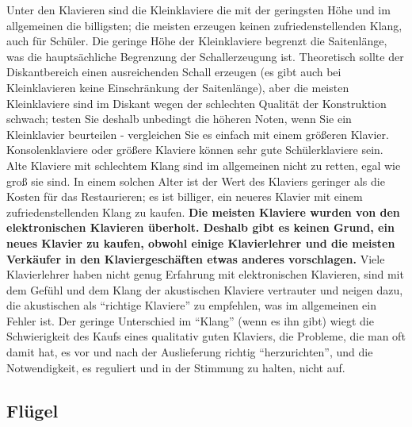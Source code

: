 Unter den Klavieren sind die Kleinklaviere die mit der geringsten Höhe und im allgemeinen die billigsten; die meisten erzeugen keinen zufriedenstellenden Klang, auch für Schüler.
Die geringe Höhe der Kleinklaviere begrenzt die Saitenlänge, was die hauptsächliche Begrenzung der Schallerzeugung ist.
Theoretisch sollte der Diskantbereich einen ausreichenden Schall erzeugen (es gibt auch bei Kleinklavieren keine Einschränkung der Saitenlänge), aber die meisten Kleinklaviere sind im Diskant wegen der schlechten Qualität der Konstruktion schwach; testen Sie deshalb unbedingt die höheren Noten, wenn Sie ein Kleinklavier beurteilen - vergleichen Sie es einfach mit einem größeren Klavier.
Konsolenklaviere oder größere Klaviere können sehr gute Schülerklaviere sein.
Alte Klaviere mit schlechtem Klang sind im allgemeinen nicht zu retten, egal wie groß sie sind.
In einem solchen Alter ist der Wert des Klaviers geringer als die Kosten für das Restaurieren; es ist billiger, ein neueres Klavier mit einem zufriedenstellenden Klang zu kaufen.
\textbf{Die meisten Klaviere wurden von den elektronischen Klavieren überholt.
Deshalb gibt es keinen Grund, ein neues Klavier zu kaufen, obwohl einige Klavierlehrer und die meisten Verkäufer in den Klaviergeschäften etwas anderes vorschlagen.}
Viele Klavierlehrer haben nicht genug Erfahrung mit elektronischen Klavieren, sind mit dem Gefühl und dem Klang der akustischen Klaviere vertrauter und neigen dazu, die akustischen als \enquote{richtige Klaviere} zu empfehlen, was im allgemeinen ein Fehler ist.
Der geringe Unterschied im \enquote{Klang} (wenn es ihn gibt) wiegt die Schwierigkeit des Kaufs eines qualitativ guten Klaviers, die Probleme, die man oft damit hat, es vor und nach der Auslieferung richtig \enquote{herzurichten}, und die Notwendigkeit, es reguliert und in der Stimmung zu halten, nicht auf.


\subsection{Flügel}
\label{c1iii17d}

